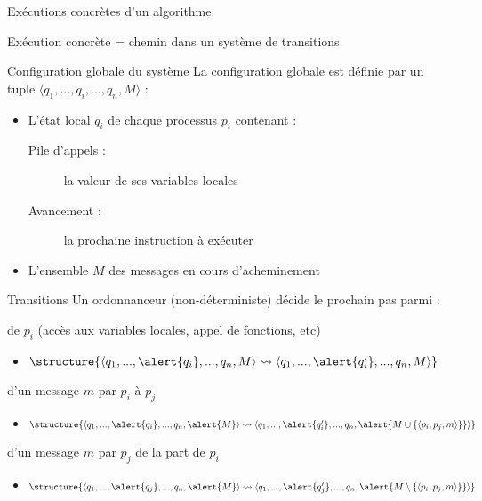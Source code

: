
\begingroup

\begin{frame}{Exécutions concrètes d'un algorithme}

  Exécution concrète = chemin dans un système de transitions.

  \begin{block}{Configuration globale du système}
    La \alert{configuration globale} est définie par un tuple \alert{$\langle q_1, ..., q_i, ..., q_n, M \rangle$} :
    \begin{itemize}
    \item L'état local \alert{$q_i$} de chaque processus $p_i$ contenant :
      \begin{description}
      \item[Pile d'appels :] la valeur de ses variables locales
      \item[Avancement :] la prochaine instruction à exécuter
      \end{description}
    \item L'ensemble \alert{$M$} des messages en cours d'acheminement
    \end{itemize}
  \end{block}

  \begin{block}{Transitions}
    Un \alert{ordonnanceur} (non-déterministe) décide le prochain pas parmi :
    \begin{description}[Réception]
    \item[Pas local] de $p_i$ (accès aux variables locales, appel de fonctions, etc)
      \begin{itemize}
      \item $\structure{\langle q_1, ..., \alert{q_i}, ..., q_n, M \rangle \leadsto \langle q_1, ..., \alert{q_i'}, ..., q_n, M \rangle}$
      \end{itemize}
    \item[Envoi] d'un message $m$ par $p_i$ à $p_j$
      \begin{itemize}
      \item $\structure{\langle q_1, ..., \alert{q_i}, ..., q_n, \alert{M} \rangle \leadsto \langle q_1, ..., \alert{q_i'}, ..., q_n, \alert{M \cup \{\langle p_i, p_j, m \rangle\}} \rangle}$
      \end{itemize}
    \item[Réception] d'un message $m$ par $p_j$ de la part de $p_i$ 
      \begin{itemize}
      \item $\structure{\langle q_1, ..., \alert{q_j}, ..., q_n, \alert{M} \rangle \leadsto \langle q_1, ..., \alert{q_j'}, ..., q_n, \alert{M \setminus \{\langle p_i, p_j, m \rangle\}} \rangle}$
      \end{itemize}
    \end{description}
  \end{block}

\end{frame}

\endgroup
\endinput
